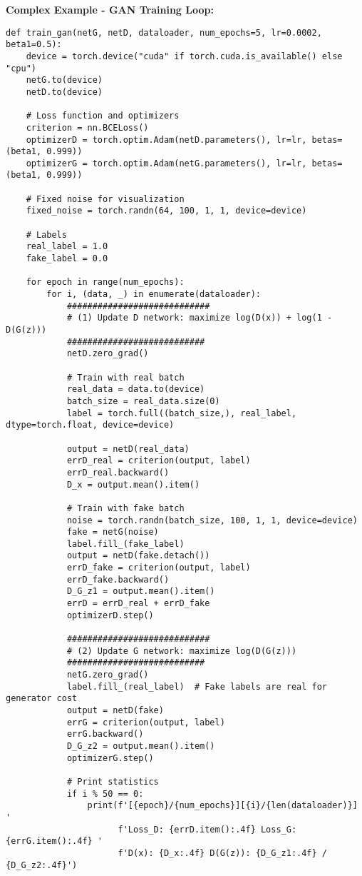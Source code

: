 \documentclass[11pt,a4paper]{book}
\begin{document}
\textbf{Complex Example - GAN Training Loop:}
\begin{verbatim}
def train_gan(netG, netD, dataloader, num_epochs=5, lr=0.0002, beta1=0.5):
    device = torch.device("cuda" if torch.cuda.is_available() else "cpu")
    netG.to(device)
    netD.to(device)
    
    # Loss function and optimizers
    criterion = nn.BCELoss()
    optimizerD = torch.optim.Adam(netD.parameters(), lr=lr, betas=(beta1, 0.999))
    optimizerG = torch.optim.Adam(netG.parameters(), lr=lr, betas=(beta1, 0.999))
    
    # Fixed noise for visualization
    fixed_noise = torch.randn(64, 100, 1, 1, device=device)
    
    # Labels
    real_label = 1.0
    fake_label = 0.0
    
    for epoch in range(num_epochs):
        for i, (data, _) in enumerate(dataloader):
            ############################
            # (1) Update D network: maximize log(D(x)) + log(1 - D(G(z)))
            ###########################
            netD.zero_grad()
            
            # Train with real batch
            real_data = data.to(device)
            batch_size = real_data.size(0)
            label = torch.full((batch_size,), real_label, dtype=torch.float, device=device)
            
            output = netD(real_data)
            errD_real = criterion(output, label)
            errD_real.backward()
            D_x = output.mean().item()
            
            # Train with fake batch
            noise = torch.randn(batch_size, 100, 1, 1, device=device)
            fake = netG(noise)
            label.fill_(fake_label)
            output = netD(fake.detach())
            errD_fake = criterion(output, label)
            errD_fake.backward()
            D_G_z1 = output.mean().item()
            errD = errD_real + errD_fake
            optimizerD.step()
            
            ############################
            # (2) Update G network: maximize log(D(G(z)))
            ###########################
            netG.zero_grad()
            label.fill_(real_label)  # Fake labels are real for generator cost
            output = netD(fake)
            errG = criterion(output, label)
            errG.backward()
            D_G_z2 = output.mean().item()
            optimizerG.step()
            
            # Print statistics
            if i % 50 == 0:
                print(f'[{epoch}/{num_epochs}][{i}/{len(dataloader)}] '
                      f'Loss_D: {errD.item():.4f} Loss_G: {errG.item():.4f} '
                      f'D(x): {D_x:.4f} D(G(z)): {D_G_z1:.4f} / {D_G_z2:.4f}')
        

\end{verbatim}
\end{document}
